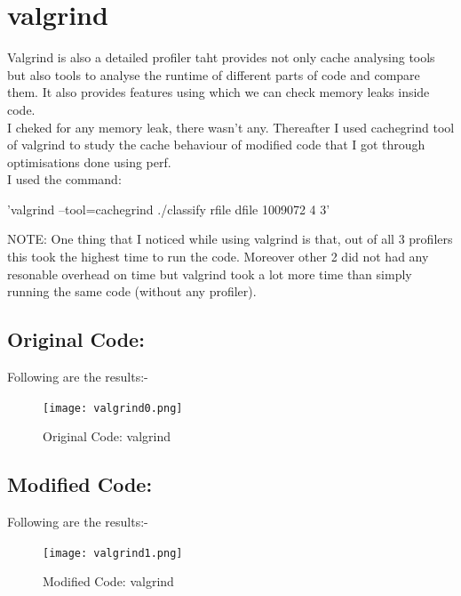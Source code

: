 \documentclass{article}
\begin{document}
\section{valgrind}
Valgrind is also a detailed profiler taht provides not only cache analysing tools but also tools to analyse the runtime of different parts of code and compare them. It also provides features using which we can check memory leaks inside code. \\
I cheked for any memory leak, there wasn't any. Thereafter I used cachegrind tool of valgrind to study the cache behaviour of modified code that I got through optimisations done using perf.\\

I used the command: 
\begin{center}
    'valgrind --tool=cachegrind ./classify rfile dfile 1009072 4 3'
\end{center}
\textsc{NOTE: } One thing that I noticed while using valgrind is that, out of all 3 profilers this took the highest time to run the code. Moreover other 2 did not had any resonable overhead on time but valgrind took a lot more time than simply running the same code (without any profiler).
\subsection{Original Code: }
Following are the results:- \\
\begin{figure}[H]
    \centering
    \texttt{[image: valgrind0.png]}
    \caption{Original Code: valgrind}
\end{figure}
\subsection{Modified Code: }
Following are the results:- \\
\begin{figure}[H]
    \centering
    \texttt{[image: valgrind1.png]}
    \caption{Modified Code: valgrind}
\end{figure}
\end{document}
